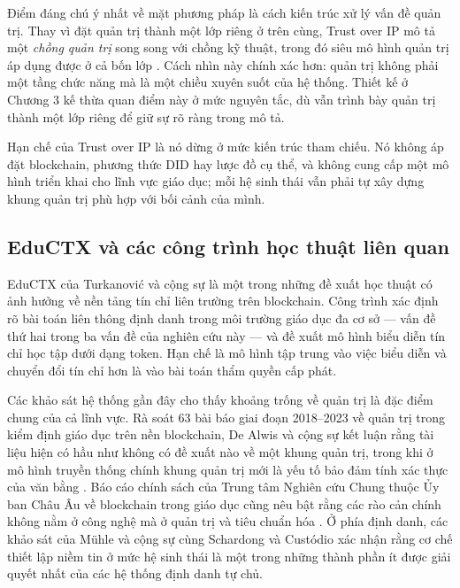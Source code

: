 Điểm đáng chú ý nhất về mặt phương pháp là cách kiến trúc xử lý vấn đề quản trị. Thay vì đặt quản trị thành một lớp riêng ở trên cùng, Trust over IP mô tả một \emph{chồng quản trị} song song với chồng kỹ thuật, trong đó siêu mô hình quản trị áp dụng được ở cả bốn lớp \cite{ToIP_GovMetamodel2022}. Cách nhìn này chính xác hơn: quản trị không phải một tầng chức năng mà là một chiều xuyên suốt của hệ thống. Thiết kế ở Chương 3 kế thừa quan điểm này ở mức nguyên tắc, dù vẫn trình bày quản trị thành một lớp riêng để giữ sự rõ ràng trong mô tả.

Hạn chế của Trust over IP là nó dừng ở mức kiến trúc tham chiếu. Nó không áp đặt blockchain, phương thức DID hay lược đồ cụ thể, và không cung cấp một mô hình triển khai cho lĩnh vực giáo dục; mỗi hệ sinh thái vẫn phải tự xây dựng khung quản trị phù hợp với bối cảnh của mình.

\subsection{EduCTX và các công trình học thuật liên quan}

EduCTX của Turkanović và cộng sự \cite{Turkanovic2018} là một trong những đề xuất học thuật có ảnh hưởng về nền tảng tín chỉ liên trường trên blockchain. Công trình xác định rõ bài toán liên thông định danh trong môi trường giáo dục đa cơ sở --- vấn đề thứ hai trong ba vấn đề của nghiên cứu này --- và đề xuất mô hình biểu diễn tín chỉ học tập dưới dạng token. Hạn chế là mô hình tập trung vào việc biểu diễn và chuyển đổi tín chỉ hơn là vào bài toán thẩm quyền cấp phát.

Các khảo sát hệ thống gần đây cho thấy khoảng trống về quản trị là đặc điểm chung của cả lĩnh vực. Rà soát 63 bài báo giai đoạn 2018--2023 về quản trị trong kiểm định giáo dục trên nền blockchain, De Alwis và cộng sự kết luận rằng tài liệu hiện có hầu như không có đề xuất nào về một khung quản trị, trong khi ở mô hình truyền thống chính khung quản trị mới là yếu tố bảo đảm tính xác thực của văn bằng \cite{DeAlwis2025}. Báo cáo chính sách của Trung tâm Nghiên cứu Chung thuộc Ủy ban Châu Âu về blockchain trong giáo dục cũng nêu bật rằng các rào cản chính không nằm ở công nghệ mà ở quản trị và tiêu chuẩn hóa \cite{Grech2017}. Ở phía định danh, các khảo sát của Mühle và cộng sự \cite{Muhle2018} cùng Schardong và Custódio \cite{Schardong2022} xác nhận rằng cơ chế thiết lập niềm tin ở mức hệ sinh thái là một trong những thành phần ít được giải quyết nhất của các hệ thống định danh tự chủ.

